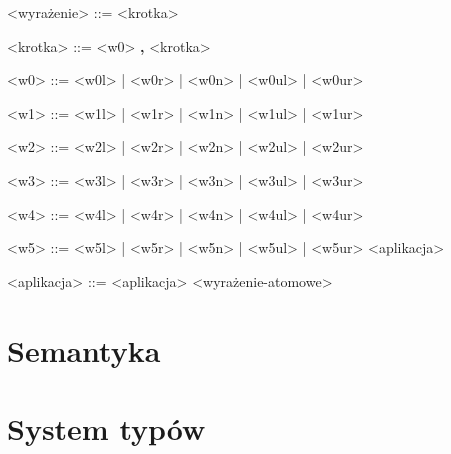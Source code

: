 \documentclass[12pt]{article}
\begin{document}
\begin{grammar}
<wyrażenie> ::=
    <krotka>

<krotka> ::=
    <w0>
     \textbf{,} <krotka>

<w0> ::=
    <w0l> | <w0r> | <w0n> | <w0ul> | <w0ur>

<w1> ::=
    <w1l> | <w1r> | <w1n> | <w1ul> | <w1ur>

<w2> ::=
    <w2l> | <w2r> | <w2n> | <w2ul> | <w2ur>

<w3> ::=
    <w3l> | <w3r> | <w3n> | <w3ul> | <w3ur>

<w4> ::=
    <w4l> | <w4r> | <w4n> | <w4ul> | <w4ur>

<w5> ::=
    <w5l> | <w5r> | <w5n> | <w5ul> | <w5ur>
    \alt <aplikacja>

<aplikacja> ::=
    <aplikacja> <wyrażenie-atomowe>


\end{grammar}

\section{Semantyka}

\section{System typów}
\end{document}
